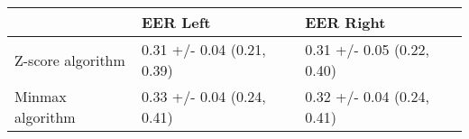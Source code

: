 \begin{tabular}{lll}
\toprule
{} &                    EER Left &                   EER Right \\
\midrule
Z-score algorithm &  0.31 +/- 0.04 (0.21, 0.39) &  0.31 +/- 0.05 (0.22, 0.40) \\
Minmax algorithm  &  0.33 +/- 0.04 (0.24, 0.41) &  0.32 +/- 0.04 (0.24, 0.41) \\
\bottomrule
\end{tabular}
